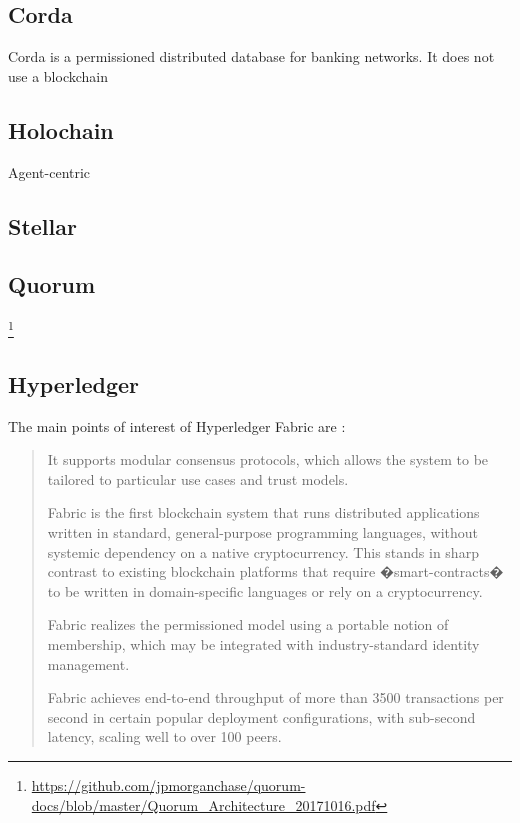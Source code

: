 \subsection{Corda}
Corda \cite{Hearn2016} is a permissioned distributed database for banking networks. It does not use a blockchain



\subsection{Holochain}
Agent-centric
\cite{HarrisBrownEtAl2018}








\subsection{Stellar}


\subsection{Quorum}

\footnote{\url{https://github.com/jpmorganchase/quorum-docs/blob/master/Quorum_Architecture_20171016.pdf}}



\subsection{Hyperledger}
The main points of interest of Hyperledger Fabric are \cite{AndroulakiEtAl2018}:

\begin{quote}
\begin{packed_item1}
\item It supports modular consensus protocols, which allows the system to be tailored to particular use cases and trust models.
\item Fabric is the first blockchain system that runs distributed applications written in standard, general-purpose programming languages, without systemic dependency on a native cryptocurrency. This stands in sharp contrast to existing blockchain platforms that require �smart-contracts� to be written in domain-specific languages or rely on a cryptocurrency.
\item Fabric realizes the permissioned model using a portable notion of membership, which may be integrated with industry-standard identity management.
\item Fabric achieves end-to-end throughput of more than 3500 transactions per second in certain popular deployment configurations, with sub-second latency, scaling well to over 100 peers.
\end{packed_item1}
\end{quote}



